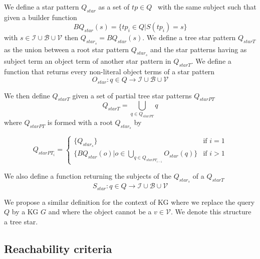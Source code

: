 \begin{definition}\label{def:starPattern}
    We define a star pattern $Q_{star}$ as a set of $tp \in Q$~\cite{Karim2020} with the same subject such that 
    given a builder function 
    \begin{equation}
        BQ_{star}(s) = \{tp_i \in Q| S(tp_i) = s\}
    \end{equation}
    with $s \in \mathcal{I} \cup \mathcal{B} \cup \mathcal{V}$ then $Q_{star_s} = BQ_{star}(s)$.
    We define a tree star pattern $Q_{starT}$ as the union between a root star pattern $Q_{star_s}$
    and the star patterns having as subject term an object term of another star pattern in $Q_{starT}$.
    We define a function that returns every non-literal object terms of a star pattern
    \begin{equation}
        O_{star}: q \in Q \rightarrow  \mathcal{I} \cup \mathcal{B} \cup \mathcal{V}
    \end{equation}

    We then define $Q_{starT}$ given a  set of partial tree star patterns $Q_{starPT}$
    \begin{equation}
        Q_{starT} = \bigcup_{q \in Q_{starPT}} q
    \end{equation}
    where $Q_{starPT}$ is formed with a root $Q_{star_s}$ by

    \begin{equation}
            Q_{starPT_i} =
        \begin{cases}
            \{Q_{star_s}\} & \text{if } i = 1 \\
            \{BQ_{star}(o)| o \in \bigcup_{q \in Q_{starPT_{i-1}}} O_{star}(q)\} & \text{if } i>1
        \end{cases}
    \end{equation}

    We also define a function returning the subjects of the $Q_{star_s}$ of a $Q_{starT}$
    \begin{equation}
        S_{star}: q \in Q \rightarrow  \mathcal{I} \cup \mathcal{B} \cup \mathcal{V}
    \end{equation}

    We propose a similar definition for the context of KG where we replace the query $Q$ by a KG $G$ and where the object 
    cannot be a $v \in \mathcal{V}$. 
    We denote this structure a tree star.

\end{definition}

\subsection{Reachability criteria}

